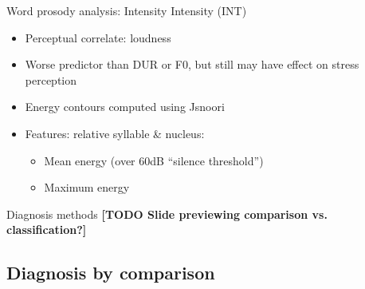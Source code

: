 \documentclass[xcolor={dvipsnames}]{beamer}
\newcommand{\TODO}[1]{{\color{red}\textbf{[TODO #1]}}}
\begin{document}
		\begin{frame}{Word prosody analysis: Intensity}
		Intensity (INT)
			\begin{itemize}
			\item Perceptual correlate: loudness
			\item Worse predictor than DUR or F0, but still may have effect on stress perception
			\item Energy contours computed using Jsnoori
			\item Features: relative syllable \& nucleus:
				\begin{itemize}
				\item Mean energy (over 60dB ``silence threshold'')
				\item Maximum energy
				\end{itemize}
			\end{itemize}
		\end{frame}
		
		
	\begin{frame}{Diagnosis methods}
	\TODO{Slide previewing comparison vs. classification?}
	\end{frame} 
	
	\subsection{Diagnosis by comparison}
%		
%		
%		
%		
%		 
%
%		
%		
		
\end{document}
